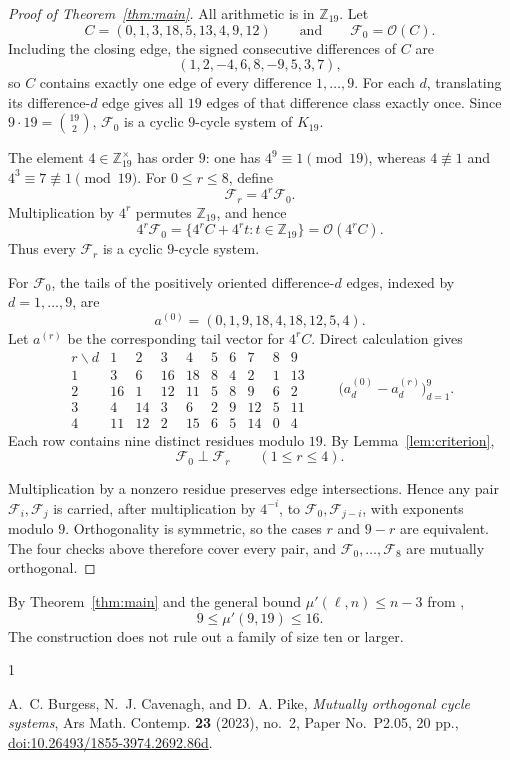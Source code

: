 \documentclass[11pt]{amsart}
\newcommand{\Z}{\mathbb Z}
\begin{document}
\begin{proof}[Proof of Theorem~\ref{thm:main}]
All arithmetic is in $\Z_{19}$. Let
\[
C=(0,1,3,18,5,13,4,9,12)
\qquad\text{and}\qquad
\mathcal F_0=\mathcal O(C).
\]
Including the closing edge, the signed consecutive differences of $C$ are
\[
(1,2,-4,6,8,-9,5,3,7),
\]
so $C$ contains exactly one edge of every difference $1,\ldots,9$. For each
$d$, translating its difference-$d$ edge gives all $19$ edges of that
difference class exactly once. Since $9\cdot19=\binom{19}{2}$,
$\mathcal F_0$ is a cyclic $9$-cycle system of $K_{19}$.

The element $4\in\Z_{19}^{\times}$ has order $9$: one has
$4^9\equiv1\pmod{19}$, whereas $4\not\equiv1$ and
$4^3\equiv7\not\equiv1\pmod{19}$. For $0\leq r\leq8$, define
\[
\mathcal F_r=4^r\mathcal F_0.
\]
Multiplication by $4^r$ permutes $\Z_{19}$, and hence
\[
4^r\mathcal F_0
 =\{4^rC+4^rt:t\in\Z_{19}\}
 =\mathcal O(4^rC).
\]
Thus every $\mathcal F_r$ is a cyclic $9$-cycle system.

For $\mathcal F_0$, the tails of the positively oriented difference-$d$
edges, indexed by $d=1,\ldots,9$, are
\[
a^{(0)}=(0,1,9,18,4,18,12,5,4).
\]
Let $a^{(r)}$ be the corresponding tail vector for $4^rC$. Direct
calculation gives
\[
\begin{array}{c|rrrrrrrrr}
 r\backslash d&1&2&3&4&5&6&7&8&9\\ \hline
 1& 3& 6&16&18& 8& 4& 2&1&13\\
 2&16& 1&12&11& 5& 8& 9&6& 2\\
 3& 4&14& 3& 6& 2& 9&12&5&11\\
 4&11&12& 2&15& 6& 5&14&0& 4
\end{array}
\qquad
\bigl(a^{(0)}_d-a^{(r)}_d\bigr)_{d=1}^{9}.
\]
Each row contains nine distinct residues modulo $19$. By
Lemma~\ref{lem:criterion},
\[
\mathcal F_0\perp\mathcal F_r
\qquad (1\leq r\leq4).
\]

Multiplication by a nonzero residue preserves edge intersections. Hence any
pair $\mathcal F_i,\mathcal F_j$ is carried, after multiplication by
$4^{-i}$, to $\mathcal F_0,\mathcal F_{j-i}$, with exponents modulo $9$.
Orthogonality is symmetric, so the cases $r$ and $9-r$ are equivalent. The
four checks above therefore cover every pair, and
$\mathcal F_0,\ldots,\mathcal F_8$ are mutually orthogonal.
\end{proof}

By Theorem~\ref{thm:main} and the general bound
$\mu'(\ell,n)\leq n-3$ from \cite[Lemma~6.4]{BCP},
\[
9\leq\mu'(9,19)\leq16.
\]
The construction does not rule out a family of size ten or larger.

\begin{thebibliography}{1}

A.~C. Burgess, N.~J. Cavenagh, and D.~A. Pike,
\emph{Mutually orthogonal cycle systems},
Ars Math. Contemp. \textbf{23} (2023), no.~2, Paper No.~P2.05, 20 pp.,
\href{https://doi.org/10.26493/1855-3974.2692.86d}
{doi:10.26493/1855-3974.2692.86d}.

\end{thebibliography}
\end{document}
